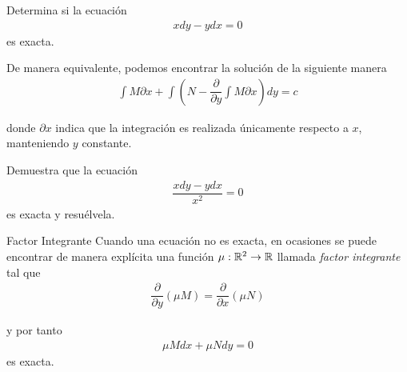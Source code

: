 
	\begin{problema}
		Determina si la ecuación
		\begin{align*}
			xdy-ydx=0
		\end{align*}
		es exacta.
	\end{problema}

{}
  De manera equivalente, podemos encontrar la solución de la siguiente manera 
  \begin{align*}
   \displaystyle \int M\partial x+ \int \left( N - \dfrac{\partial }{\partial y}\int M\partial x \right)dy = c
   \end{align*}
   
   donde \emph{$\partial x$} indica que la integración es realizada únicamente respecto a $x$, manteniendo $y$ constante. 


	\begin{problema}
		Demuestra que la ecuación
		\begin{align*}
		\dfrac{xdy-ydx}{x^2}=0
		\end{align*}
		es exacta y resuélvela. 
	\end{problema}

{Factor Integrante}
  Cuando una ecuación no es exacta, en ocasiones se puede encontrar de manera explícita una función $\mu:\mathbb{R}^{2}\to \mathbb{R}$ llamada \emph{factor integrante} tal que 
\begin{align*}
 \dfrac{\partial }{\partial y}\left( \mu M \right) = 
 \dfrac{\partial }{\partial x}\left( \mu N \right)
 \end{align*}
 
 y por tanto 
 \begin{align*}
  \mu M dx + \mu N dy = 0
  \end{align*}
  es exacta.

